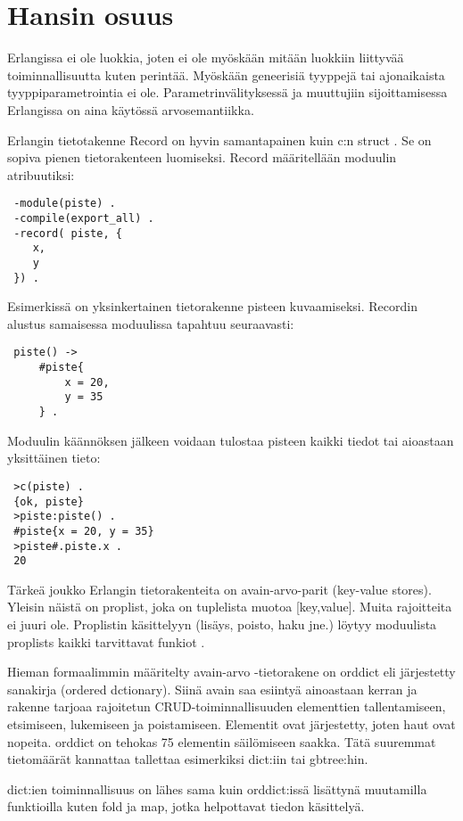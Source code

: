 \documentclass[11pt,oneside,a4paper]{article}
\begin{document}
\section{Hansin osuus}
Erlangissa ei ole luokkia, joten ei ole myöskään mitään luokkiin liittyvää
toiminnallisuutta kuten perintää. Myöskään geneerisiä tyyppejä tai ajonaikaista
tyyppiparametrointia ei ole. 
Parametrinvälityksessä ja muuttujiin sijoittamisessa Erlangissa on aina käytössä
arvosemantiikka. 

Erlangin tietotakenne Record on hyvin samantapainen kuin c:n struct
\cite{HEB13}. Se on sopiva pienen tietorakenteen luomiseksi. Record määritellään
moduulin atribuutiksi:
 \begin{verbatim}
 -module(piste) .
 -compile(export_all) .
 -record( piste, {
    x,
    y
 }) .
 \end{verbatim}
 Esimerkissä on yksinkertainen tietorakenne pisteen kuvaamiseksi. Recordin
alustus samaisessa moduulissa tapahtuu seuraavasti: 
\begin{verbatim}
 piste() -> 
     #piste{
         x = 20,
         y = 35
     } .
 \end{verbatim}
Moduulin käännöksen jälkeen voidaan tulostaa pisteen kaikki tiedot tai aioastaan
yksittäinen tieto:
\begin{verbatim}
 >c(piste) .
 {ok, piste}
 >piste:piste() .
 #piste{x = 20, y = 35}
 >piste#.piste.x .
 20
 \end{verbatim}


 Tärkeä joukko Erlangin tietorakenteita on avain-arvo-parit (key-value stores).
Yleisin näistä on proplist, joka on tuplelista muotoa [{key,value}]. Muita
rajoitteita ei juuri ole. Proplistin käsittelyyn (lisäys, poisto, haku jne.)
löytyy moduulista proplists kaikki tarvittavat funkiot \cite{HEB13}. 
 
 Hieman formaalimmin määritelty avain-arvo -tietorakene on orddict eli
järjestetty sanakirja (ordered dctionary). Siinä avain saa esiintyä ainoastaan
kerran ja rakenne tarjoaa rajoitetun CRUD-toiminnallisuuden elementtien
tallentamiseen, etsimiseen, lukemiseen ja poistamiseen. Elementit ovat
järjestetty, joten haut ovat nopeita\cite{HEB13}. orddict on tehokas 75
elementin säilömiseen saakka. Tätä suuremmat tietomäärät kannattaa tallettaa
esimerkiksi dict:iin tai gb\textunderscore tree:hin. 
 
 dict:ien toiminnallisuus on lähes sama kuin orddict:issä  lisättynä muutamilla
funktioilla kuten fold ja map, jotka helpottavat tiedon käsittelyä. 
 
\end{document}
